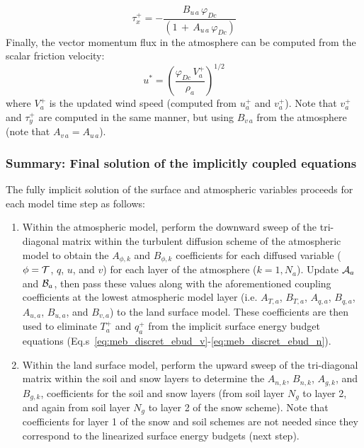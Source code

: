 {\begin{equation}
  \label{eq:meb_mom_flux_atmos_n_a}
\tau_x^+ = -{\frac {B_{u\,a}\,\varphi_{Dc}}
{\left(1 \,+\, A_{u\,a}\,\varphi_{Dc}\right)}}
%
\end{equation}
%
Finally, the vector momentum flux in the atmosphere can be computed
from the scalar friction velocity:
%
\begin{equation}
\label{eq:meb_impl_ustar}
%
u^\ast = {\left({\frac {\varphi_{Dc} \,
V_a^+}{\rho_a}}\right)}^{1/2}
%
\end{equation}
%
where $V_a^+$ is the updated wind speed (computed from $u_a^+$ and $v_a^+$).
%
Note that $v_a^+$ and $\tau_y^+$ are computed in the same manner, 
but using $B_{v\,a}$
from the atmosphere (note that $A_{v\,a}=A_{u\,a}$).

\subsubsection{Summary: Final solution of the implicitly coupled equations}

The fully implicit solution of the surface and atmospheric variables
proceeds for each model time step as follows:

\begin{enumerate} 

\item Within the atmospheric model, 
  perform
  the downward sweep of the tri-diagonal matrix within the
  turbulent diffusion scheme of the atmospheric model to obtain
  the $A_{\phi,k}$ and $B_{\phi,k}$ coefficients for each 
  diffused variable ($\phi={\cal T}$, $q$, $u$, and $v$) 
  for each layer of
  the atmosphere ($k=1,N_a$). Update ${\cal A}_a$ and ${\cal B}_a$, then pass
  these values along with the aforementioned coupling coefficients at the lowest
  atmospheric model layer
  (i.e. $A_{T,a}$, $B_{T,a}$,  $A_{q,a}$, $B_{q,a}$,  $A_{u,a}$, $B_{u,a}$,
  and $B_{v,a}$)
  to the land surface model. These coefficients are
  then used to eliminate $T_a^+$ and $q_a^+$ from the implicit surface energy
  budget equations (Eq.s~\ref{eq:meb_discret_ebud_v}-\ref{eq:meb_discret_ebud_n}).

\item Within the land surface model, perform
  the upward sweep of the tri-diagonal matrix within the soil and snow
  layers to determine the $A_{n,k}$, $B_{n,k}$, $A_{g,k}$, and $B_{g,k}$, 
  coefficients for the soil and snow layers (from soil layer $N_g$ to layer
  2, and again from soil layer $N_g$ to layer 2 of the snow
  scheme). Note that coefficients for layer 1 of the snow and soil
  schemes are not needed since they correspond to the linearized surface energy
  budgets (next step).
  

\end{enumerate}}
